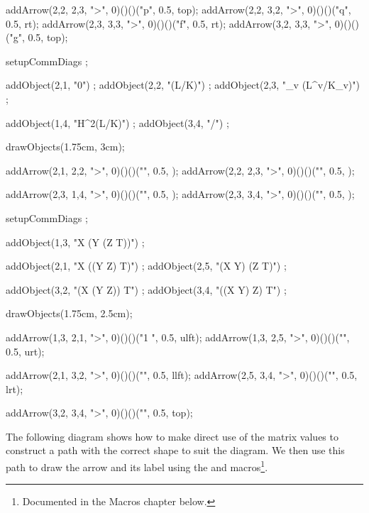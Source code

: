   addArrow(2,2, 2,3, ">", 0)()()("p", 0.5, top);
  addArrow(2,2, 3,2, ">", 0)()()("q", 0.5, rt);
  addArrow(2,3, 3,3, ">", 0)()()("f", 0.5, rt);
  addArrow(3,2, 3,3, ">", 0)()()("g", 0.5, top);
\stopMPcode\stopformula
\stopbuffer

\processTEXbuffer

\typebuffer

\blank[2*big]

\startbuffer
\startformula{}
  setupCommDiags ;
  
  addObject(2,1, "0") ;
  addObject(2,2, "(L/K)") ;
  addObject(2,3, "\bigoplus_v (L^v/K_v)") ;
  
  addObject(1,4, "H^2(L/K)") ;
  addObject(3,4, "/") ;
    
  drawObjects(1.75cm, 3cm);
  
  addArrow(2,1, 2,2, ">", 0)()()("", 0.5, );
  addArrow(2,2, 2,3, ">", 0)()()("", 0.5, );
  
  addArrow(2,3, 1,4, ">", 0)()()("", 0.5, );
  addArrow(2,3, 3,4, ">", 0)()()("", 0.5, );
\stopMPcode\stopformula
\stopbuffer

\processTEXbuffer

\typebuffer

\blank[2*big]

\startbuffer
\startformula{}
  setupCommDiags ;
  
  addObject(1,3, "X \otimes (Y \otimes (Z \otimes T))") ;
  
  addObject(2,1, "X \otimes ((Y \otimes Z) \otimes T)") ;
  addObject(2,5, "(X \otimes Y) \otimes (Z \otimes T)") ;
  
  addObject(3,2, "(X \otimes (Y \otimes Z)) \otimes T") ;
  addObject(3,4, "((X \otimes Y) \otimes Z) \otimes T") ;
    
  drawObjects(1.75cm, 2.5cm);
  
  addArrow(1,3, 2,1, ">", 0)()()("1 \otimes \phi", 0.5, ulft);
  addArrow(1,3, 2,5, ">", 0)()()("\phi", 0.5, urt);
  
  addArrow(2,1, 3,2, ">", 0)()()("\phi", 0.5, llft);
  addArrow(2,5, 3,4, ">", 0)()()("\phi", 0.5, lrt);
  
  addArrow(3,2, 3,4, ">", 0)()()("\phi {}", 0.5, top);
\stopMPcode\stopformula
\stopbuffer

\processTEXbuffer

\typebuffer

\blank[2*big]

The following diagram shows how to make direct use of the  
matrix values to construct a path with the correct shape to suit the 
diagram. We then use this path to draw the arrow and its label using the 
 and  macros\footnote{Documented in 
the Macros chapter below.}. 

